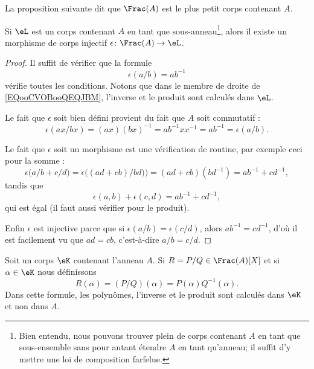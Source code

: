 La proposition suivante dit que \( \Frac(A)\) est le plus petit corps contenant \( A\).

\begin{proposition}      \label{PROPooGSHDooJOnDsp}
    Si \( \eL\) est un corps contenant \( A\) en tant que sous-anneau\footnote{Bien entendu, nous pouvons trouver plein de corps contenant \( A\) en tant que sous-ensemble sans pour autant étendre \( A\) en tant qu'anneau; il suffit d'y mettre une loi de composition farfelue.}, alors il existe un morphisme de corps injectif \( \epsilon\colon \Frac(A)\to \eL\).
\end{proposition}

\begin{proof}
    Il suffit de vérifier que la formule
    \begin{equation}        \label{EQooCVOBooQEQJBM}
        \epsilon(a/b)=ab^{-1}
    \end{equation}
    vérifie toutes les conditions. Notons que dans le membre de droite de \eqref{EQooCVOBooQEQJBM}, l'inverse et le produit sont calculés dans \( \eL\).

    Le fait que \( \epsilon\) soit bien défini provient du fait que \( A\) soit commutatif :
    \begin{equation}
        \epsilon(ax/bx)=(ax)(bx)^{-1}=ab^{-1}xx^{-1}=ab^{-1}=\epsilon(a/b).
    \end{equation}

    Le fait que \( \epsilon\) soit un morphisme est une vérification de routine, par exemple ceci pour la somme :
    \begin{equation}
        \epsilon\big( a/b+c/d \big)=\epsilon\big( (ad+cb)/bd)\big)=(ad+cb)(bd^{-1})=ab^{-1}+cd^{-1},
    \end{equation}
    tandis que
    \begin{equation}
        \epsilon(a,b)+\epsilon(c,d)=ab^{-1}+cd^{-1},
    \end{equation}
    qui est égal (il faut aussi vérifier pour le produit).

    Enfin \( \epsilon\) est injective parce que si \( \epsilon(a/b)=\epsilon(c/d)\), alors \( ab^{-1}=cd^{-1}\), d'où il est facilement vu que \( ad=cb\), c'est-à-dire \( a/b=c/d\).
\end{proof}

\begin{definition}       \label{DEFooLBIWooCPCaSY}
    Soit un corps \( \eK\) contenant l'anneau \( A\). Si \( R=P/Q\in \Frac(A)[X] \) et si \( \alpha\in \eK\) nous définissons
    \begin{equation}
        R(\alpha)=(P/Q)(\alpha)=P(\alpha)Q^{-1}(\alpha).
    \end{equation}
    Dans cette formule, les polynômes, l'inverse et le produit sont calculés dans \( \eK\) et non dans \( A\).
\end{definition}

